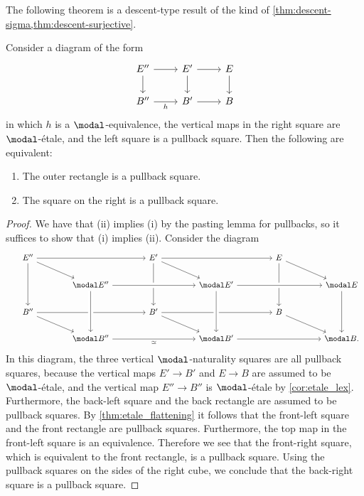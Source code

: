 \documentclass{msc}
\begin{document}
  The following theorem is a descent-type result of the kind of \cref{thm:descent-sigma,thm:descent-surjective}.

  \begin{thm}
    Consider a diagram of the form
    \begin{equation*}
      \begin{tikzcd}
        E'' \arrow[d] \arrow[r] & E' \arrow[d] \arrow[r] & E \arrow[d] \\
        B'' \arrow[r,swap,"h"] & B' \arrow[r] & B
      \end{tikzcd}
    \end{equation*}
    in which $h$ is a $\modal$-equivalence, the vertical maps in the right square are $\modal$-\'etale, and the left square is a pullback square. Then the following are equivalent:
    \begin{enumerate}
    \item The outer rectangle is a pullback square.
    \item The square on the right is a pullback square.
    \end{enumerate}
  \end{thm}

  \begin{proof}
    We have that (ii) implies (i) by the pasting lemma for pullbacks, so it suffices to show that (i) implies (ii). Consider the diagram
    \begin{equation*}
      \begin{tikzcd}
        E'' \arrow[rr] \arrow[dd] \arrow[dr] & \phantom{\modal E''} & E' \arrow[rr] \arrow[dd] \arrow[dr] & \phantom{\modal E''} & E \arrow[dd] \arrow[dr] & \phantom{\modal E''} \\
        \phantom{\modal E''} & \modal E'' \arrow[rr,crossing over] & \phantom{\modal E''} & \modal E' \arrow[rr,crossing over] & \phantom{\modal E''} & \modal E \arrow[dd] \\
        B'' \arrow[dr] \arrow[rr] & & B' \arrow[dr] \arrow[rr] & & B \arrow[dr] \\
        & \modal B'' \arrow[from=uu,crossing over] \arrow[rr,swap,"\simeq"] & & \modal B' \arrow[from=uu,crossing over] \arrow[rr] & & \modal B.
      \end{tikzcd}
    \end{equation*}
    In this diagram, the three vertical $\modal$-naturality squares are all pullback squares, because the vertical maps $E'\to B'$ and $E\to B$ are assumed to be $\modal$-\'etale, and the vertical map $E''\to B''$ is $\modal$-\'etale by \cref{cor:etale_lex}. Furthermore, the back-left square and the back rectangle are assumed to be pullback squares. By \cref{thm:etale_flattening} it follows that the front-left square and the front rectangle are pullback squares. Furthermore, the top map in the front-left square is an equivalence. Therefore we see that the front-right square, which is equivalent to the front rectangle, is a pullback square. Using the pullback squares on the sides of the right cube, we conclude that the back-right square is a pullback square.
  \end{proof}
\end{document}
